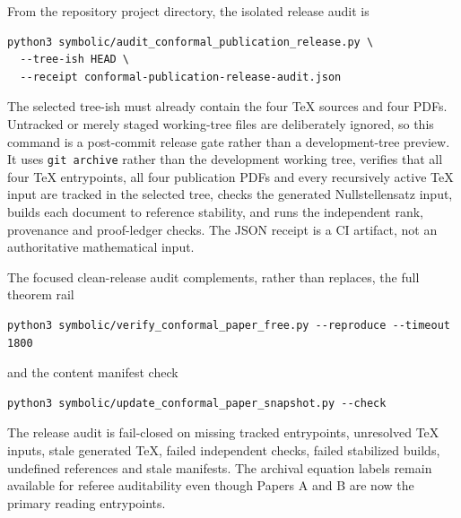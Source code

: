 \documentclass[11pt]{article}
\begin{document}
From the repository project directory, the isolated release audit is
\begin{verbatim}
python3 symbolic/audit_conformal_publication_release.py \
  --tree-ish HEAD \
  --receipt conformal-publication-release-audit.json
\end{verbatim}
The selected tree-ish must already contain the four TeX sources and four
PDFs.  Untracked or merely staged working-tree files are deliberately
ignored, so this command is a post-commit release gate rather than a
development-tree preview.
It uses \verb|git archive| rather than the development working tree, verifies
that all four TeX entrypoints, all four publication PDFs and every recursively
active TeX input are tracked in the selected tree, checks the generated
Nullstellensatz input, builds each document to reference stability, and runs the independent
rank, provenance and proof-ledger checks.  The JSON receipt is a CI artifact,
not an authoritative mathematical input.

The focused clean-release audit complements, rather than replaces, the full
theorem rail
\begin{verbatim}
python3 symbolic/verify_conformal_paper_free.py --reproduce --timeout 1800
\end{verbatim}
and the content manifest check
\begin{verbatim}
python3 symbolic/update_conformal_paper_snapshot.py --check
\end{verbatim}

The release audit is fail-closed on missing tracked entrypoints, unresolved
TeX inputs, stale generated TeX, failed independent checks, failed stabilized
builds, undefined references and stale manifests.  The archival equation
labels remain available for referee auditability even though Papers A and B
are now the primary reading entrypoints.
\end{document}
